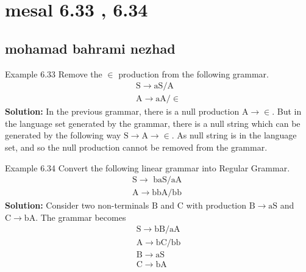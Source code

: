 \documentclass [12pt]{beamer}
\begin{document}
\section*{mesal 6.33 , 6.34 }
\subsection*{mohamad bahrami nezhad  }	
\begin{frame}
\justifying
Example 6.33  Remove the $\in$ production from the following grammar.
$$
\begin{array}{l}
	\mathrm{S} \rightarrow \mathrm{aS} / \mathrm{A} \\
	\mathrm{A} \rightarrow \mathrm{aA}/\in
\end{array}
$$
\textbf{Solution:} In the previous grammar, there is a null production $\mathrm{A} \rightarrow \in .$ But in the language set generated by the grammar, there is a null string which can be generated by the following way $\mathrm{S} \rightarrow \mathrm{A} \rightarrow \in$. As null string is in the language set, and so the null production cannot be removed from the grammar.
\end{frame}

\begin{frame}

Example 6.34 Convert the following linear grammar into Regular Grammar.
$$
\begin{array}{l}
	\mathrm{S} \rightarrow \text { baS/aA } \\
	\mathrm{A} \rightarrow \mathrm{bbA} / \mathrm{bb}
\end{array}
$$
\textbf{Solution:} Consider two non-terminals $\mathrm{B}$ and $\mathrm{C}$ with production $\mathrm{B} \rightarrow \mathrm{aS}$ and $\mathrm{C} \rightarrow \mathrm{bA} .$ The grammar becomes
$$
\begin{array}{l}
	\mathrm{S} \rightarrow \mathrm{bB} / \mathrm{aA} \\
	\mathrm{A} \rightarrow \mathrm{bC} / \mathrm{bb} \\
	\mathrm{B} \rightarrow \mathrm{aS} \\
	\mathrm{C} \rightarrow \mathrm{bA}
\end{array}
$$
\end{frame}
\end{document}
